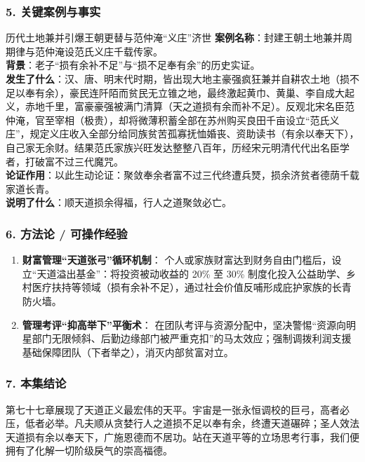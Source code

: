 \subsubsection{5. 关键案例与事实}
\begin{CaseBox}{历代土地兼并引爆王朝更替与范仲淹“义庄”济世}
\textbf{案例名称}：封建王朝土地兼并周期律与范仲淹设范氏义庄千载传家。\\
\textbf{背景}：老子“损有余补不足”与“损不足奉有余”的历史实证。\\
\textbf{发生了什么}：汉、唐、明末代时期，皆出现大地主豪强疯狂兼并自耕农土地（损不足以奉有余），豪民连阡陌而贫民无立锥之地，最终激起黄巾、黄巢、李自成大起义，赤地千里，富豪豪强被满门清算（天之道损有余而补不足）。反观北宋名臣范仲淹，官至宰相（极贵），却将微薄积蓄全部在苏州购买良田千亩设立“范氏义庄”，规定义庄收入全部分给同族贫苦孤寡抚恤婚丧、资助读书（有余以奉天下），自己家无余财。结果范氏家族兴旺发达整整八百年，历经宋元明清代代出名臣学者，打破富不过三代魔咒。\\
\textbf{论证作用}：以此生动论证：聚敛奉余者富不过三代终遭兵燹，损余济贫者德荫千载家道长青。\\
\textbf{说明了什么}：顺天道损余得福，行人之道聚敛必亡。
\end{CaseBox}

\subsubsection{6. 方法论 / 可操作经验}
\begin{enumerate}
    \item \textbf{财富管理“天道张弓”循环机制}：
    个人或家族财富达到财务自由门槛后，设立“天道溢出基金”：将投资被动收益的 20\% 至 30\% 制度化投入公益助学、乡村医疗扶持等领域（损有余补不足），通过社会价值反哺形成庇护家族的长青防火墙。
    \item \textbf{管理考评“抑高举下”平衡术}：
    在团队考评与资源分配中，坚决警惕“资源向明星部门无限倾斜、后勤边缘部门被严重克扣”的马太效应；强制调拨利润支援基础保障团队（下者举之），消灭内部贫富对立。
\end{enumerate}

\subsubsection{7. 本集结论}
第七十七章展现了天道正义最宏伟的天平。宇宙是一张永恒调校的巨弓，高者必压，低者必举。凡夫顺从贪婪行人之道损不足以奉有余，终遭天道碾碎；圣人效法天道损有余以奉天下，广施恩德而不居功。站在天道平等的立场思考行事，我们便拥有了化解一切阶级戾气的崇高福德。

